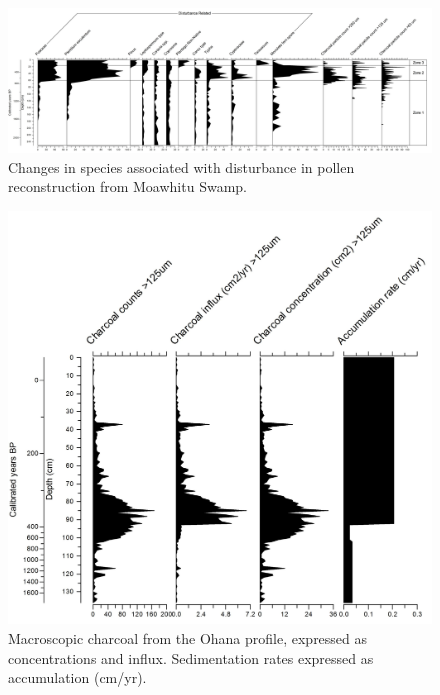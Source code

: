 \documentclass{article}
\begin{document}
\begin{figure}
	\centering
	\includegraphics[scale=0.07, angle =90]{disturbance-zone.jpg}
	\caption[Changes in species associated with disturbance in pollen reconstruction from Moawhitu Swamp.]{Changes in species associated with disturbance in pollen reconstruction from Moawhitu Swamp.}
	\label{fig:disturbance}
\end{figure}

\begin{figure}
	\centering
	\includegraphics[scale=0.07, angle=90]{ohana.jpg}
	\caption[Changes in charcoal concentration from Ohana]{Macroscopic charcoal from the Ohana profile, expressed as concentrations and influx.  Sedimentation rates expressed as accumulation (cm/yr).}
	\label{fig:charcoal-ohana}
\end{figure}
\end{document}
